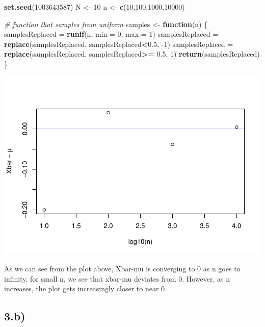 \documentclass[
]{article}
\newenvironment{Shaded}{\begin{snugshade}}{\end{snugshade}}
\newcommand{\CommentTok}[1]{\textcolor[rgb]{0.56,0.35,0.01}{\textit{#1}}}
\newcommand{\ControlFlowTok}[1]{\textcolor[rgb]{0.13,0.29,0.53}{\textbf{#1}}}
\newcommand{\DataTypeTok}[1]{\textcolor[rgb]{0.13,0.29,0.53}{#1}}
\newcommand{\DecValTok}[1]{\textcolor[rgb]{0.00,0.00,0.81}{#1}}
\newcommand{\FloatTok}[1]{\textcolor[rgb]{0.00,0.00,0.81}{#1}}
\newcommand{\KeywordTok}[1]{\textcolor[rgb]{0.13,0.29,0.53}{\textbf{#1}}}
\newcommand{\NormalTok}[1]{#1}
\newcommand{\OperatorTok}[1]{\textcolor[rgb]{0.81,0.36,0.00}{\textbf{#1}}}
\newcommand{\StringTok}[1]{\textcolor[rgb]{0.31,0.60,0.02}{#1}}
\begin{document}
\begin{Shaded}
\begin{Highlighting}[]
\KeywordTok{set.seed}\NormalTok{(}\DecValTok{1003643587}\NormalTok{)}
\NormalTok{N <-}\StringTok{ }\DecValTok{10}
\NormalTok{n <-}\StringTok{ }\KeywordTok{c}\NormalTok{(}\DecValTok{10}\NormalTok{,}\DecValTok{100}\NormalTok{,}\DecValTok{1000}\NormalTok{,}\DecValTok{10000}\NormalTok{)}

\CommentTok{# function that samples from uniform}
\NormalTok{samples <-}\StringTok{ }\ControlFlowTok{function}\NormalTok{(n) \{}
\NormalTok{  samplesReplaced =}\StringTok{ }\KeywordTok{runif}\NormalTok{(n, }\DataTypeTok{min =} \DecValTok{0}\NormalTok{, }\DataTypeTok{max =} \DecValTok{1}\NormalTok{)}
\NormalTok{  samplesReplaced =}\StringTok{ }\KeywordTok{replace}\NormalTok{(samplesReplaced, samplesReplaced}\OperatorTok{<}\FloatTok{0.5}\NormalTok{, }\DecValTok{-1}\NormalTok{)}
\NormalTok{  samplesReplaced =}\StringTok{ }\KeywordTok{replace}\NormalTok{(samplesReplaced, samplesReplaced}\OperatorTok{>=}\StringTok{ }\FloatTok{0.5}\NormalTok{, }\DecValTok{1}\NormalTok{)}
  \KeywordTok{return}\NormalTok{(samplesReplaced)}
\NormalTok{\}}
\end{Highlighting}
\end{Shaded}

\includegraphics{stad80a1_files/figure-latex/unnamed-chunk-5-1.pdf}

As we can see from the plot above, Xbar-mu is converging to 0 as n goes
to infinity. for small n, we see that xbar-mu deviates from 0. However,
as n increases, the plot gets increasingly closer to near 0.

\hypertarget{b}{%
\subsection{3.b)}\label{b}}
\end{document}
